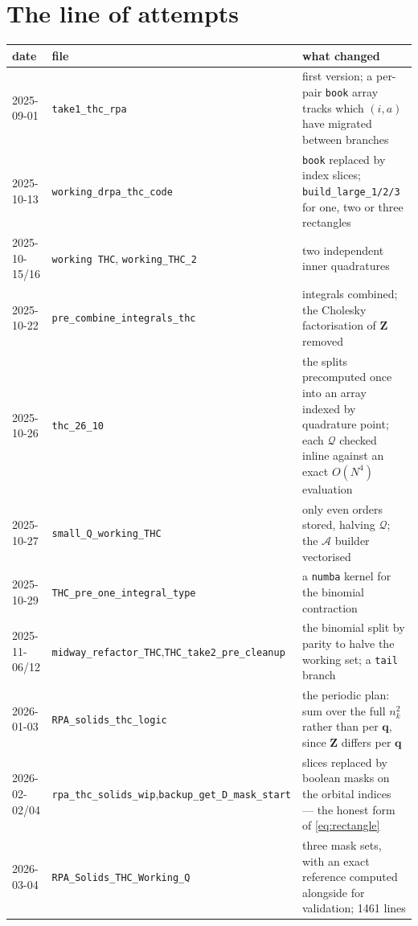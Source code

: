 \documentclass[11pt]{article}
\newcommand{\mat}[1]{{\mathbf{#1}}}
\newcommand{\Dcal}{\mathcal{A}}
\newcommand{\Qcal}{\mathcal{Q}}
\newcommand{\code}[1]{\texttt{\small #1}}
\begin{document}
\section{The line of attempts}

\begin{center}
\begin{longtable}{@{}p{1.8cm}>{\raggedright\arraybackslash}p{4.5cm}>{\raggedright\arraybackslash}p{8.9cm}@{}}
\toprule
date & file & what changed \\
\midrule
\endhead
2025-09-01 & \code{take1\_thc\_rpa} & first version; a per-pair \code{book} array tracks
    which $(i,a)$ have migrated between branches \\
2025-10-13 & \code{working\_drpa\_}\allowbreak\code{thc\_code} & \code{book} replaced by index slices;
    \code{build\_large\_1/2/3} for one, two or three rectangles \\
2025-10-15/16 & \code{working THC}, \code{working\_THC\_2} & two independent inner
    quadratures \\
2025-10-22 & \code{pre\_combine\_}\allowbreak\code{integrals\_thc} & integrals combined; the Cholesky
    factorisation of $\mat{Z}$ removed \\
2025-10-26 & \code{thc\_26\_10} & the splits precomputed once into an array indexed by
    quadrature point; each $\Qcal$ checked inline against an exact $O(N^4)$ evaluation \\
2025-10-27 & \code{small\_Q\_working\_THC} & only even orders stored, halving $\Qcal$;
    the $\Dcal$ builder vectorised \\
2025-10-29 & \code{THC\_pre\_one\_}\allowbreak\code{integral\_type} & a \code{numba} kernel for the binomial
    contraction \\
2025-11-06/12 & \code{midway\_refactor\_THC},\newline \code{THC\_take2\_pre\_}\allowbreak\code{cleanup} & the binomial
    split by parity to halve the working set; a \code{tail} branch \\
2026-01-03 & \code{RPA\_solids\_thc\_logic} & the periodic plan: sum over the full
    $n_k^2$ rather than per $\mathbf{q}$, since $\mat{Z}$ differs per $\mathbf{q}$ \\
2026-02-02/04 & \code{rpa\_thc\_solids\_wip},\newline \code{backup\_get\_D\_}\allowbreak\code{mask\_start} & slices
    replaced by boolean masks on the orbital indices --- the honest form of
    \eqref{eq:rectangle} \\
2026-03-04 & \code{RPA\_Solids\_THC\_}\allowbreak\code{Working\_Q} & three mask sets, with an exact reference
    computed alongside for validation; 1461 lines \\
\bottomrule
\end{longtable}
\end{center}
\end{document}
